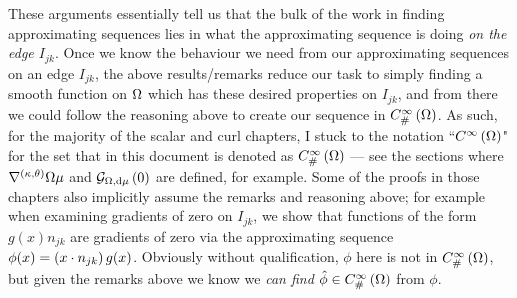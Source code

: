 \documentclass[11pt]{report}
\newcommand{\psmooth}[1]{C^{\infty}_{\#}\bracs{#1}}
\begin{document}
These arguments essentially tell us that the bulk of the work in finding approximating sequences lies in what the approximating sequence is doing \emph{on the edge $I_{jk}$}.
Once we know the behaviour we need from our approximating sequences on an edge $I_{jk}$, the above results/remarks reduce our task to simply finding a smooth function on $\Omega$ which has these desired properties on $I_{jk}$, and from there we could follow the reasoning above to create our sequence in $\psmooth{\ddom}$.
As such, for the majority of the scalar and curl chapters, I stuck to the notation ``$C^{\infty}\left( \Omega \right)$" for the set that in this document is denoted as $\psmooth{\ddom}$ --- see the sections where $\nabla^{\left( \kappa, \theta \right)}{\Omega}{\mu}$ and $\mathcal{G}_{ \Omega, \mathrm{d}\mu}\left( 0 \right)$ are defined, for example.
Some of the proofs in those chapters also implicitly assume the remarks and reasoning above; for example when examining gradients of zero on $I_{jk}$, we show that functions of the form $g(x)n_{jk}$ are gradients of zero via the approximating sequence $\phi(x) = \left( x\cdot n_{jk} \right)g(x)$.
Obviously without qualification, $\phi$ here is not in $\psmooth{\ddom}$, but given the remarks above we know we \emph{can find} $\hat{\phi}\in\psmooth{\ddom}$ from $\phi$.
\end{document}
